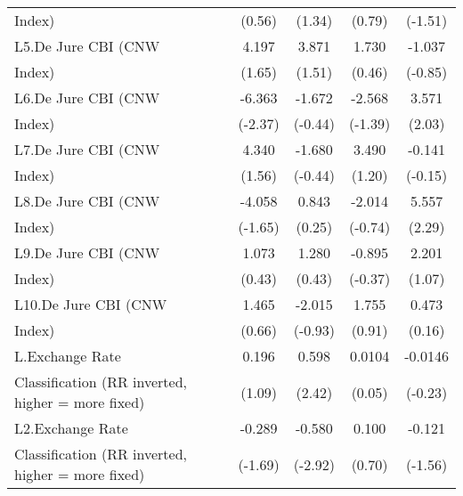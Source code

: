 {\begin{tabular}{l*{4}{c}}
Index)              &      (0.56)         &      (1.34)         &      (0.79)         &     (-1.51)         \\
[1em]
L5.De Jure CBI (CNW &       4.197         &       3.871         &       1.730         &      -1.037         \\
Index)              &      (1.65)         &      (1.51)         &      (0.46)         &     (-0.85)         \\
[1em]
L6.De Jure CBI (CNW &      -6.363\sym{*}  &      -1.672         &      -2.568         &       3.571\sym{*}  \\
Index)              &     (-2.37)         &     (-0.44)         &     (-1.39)         &      (2.03)         \\
[1em]
L7.De Jure CBI (CNW &       4.340         &      -1.680         &       3.490         &      -0.141         \\
Index)              &      (1.56)         &     (-0.44)         &      (1.20)         &     (-0.15)         \\
[1em]
L8.De Jure CBI (CNW &      -4.058         &       0.843         &      -2.014         &       5.557\sym{*}  \\
Index)              &     (-1.65)         &      (0.25)         &     (-0.74)         &      (2.29)         \\
[1em]
L9.De Jure CBI (CNW &       1.073         &       1.280         &      -0.895         &       2.201         \\
Index)              &      (0.43)         &      (0.43)         &     (-0.37)         &      (1.07)         \\
[1em]
L10.De Jure CBI (CNW&       1.465         &      -2.015         &       1.755         &       0.473         \\
Index)              &      (0.66)         &     (-0.93)         &      (0.91)         &      (0.16)         \\
[1em]
L.Exchange Rate     &       0.196         &       0.598\sym{*}  &      0.0104         &     -0.0146         \\
Classification (RR inverted, higher = more fixed)&      (1.09)         &      (2.42)         &      (0.05)         &     (-0.23)         \\
[1em]
L2.Exchange Rate    &      -0.289         &      -0.580\sym{**} &       0.100         &      -0.121         \\
Classification (RR inverted, higher = more fixed)&     (-1.69)         &     (-2.92)         &      (0.70)         &     (-1.56)         \\

\end{tabular}}
